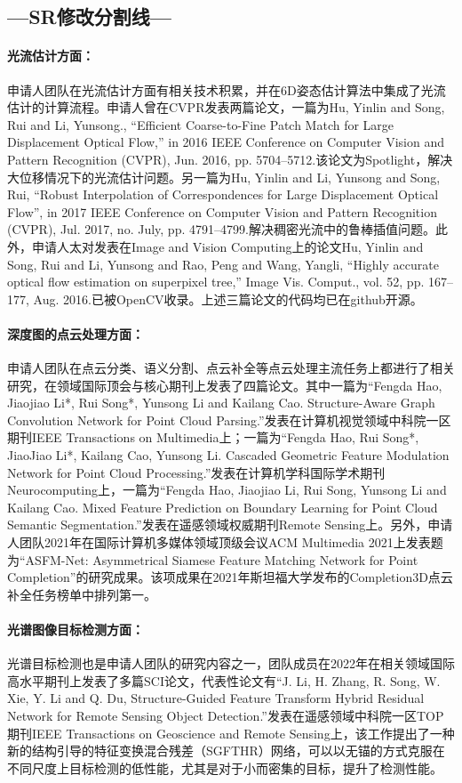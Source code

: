 \documentclass[12pt]{article}
\newcommand{\myPara}[1]{\paragraph{#1：}}
\begin{document}
\subsection{---SR修改分割线---}
\fi
\myPara{光流估计方面}
申请人团队在光流估计方面有相关技术积累，并在6D姿态估计算法中集成了光流估计的计算流程。申请人曾在CVPR发表两篇论文，一篇为Hu, Yinlin and Song, Rui and Li, Yunsong., “Efficient Coarse-to-Fine Patch Match for Large Displacement Optical Flow,” in 2016 IEEE Conference on Computer Vision and Pattern Recognition (CVPR), Jun. 2016, pp. 5704–5712.该论文为Spotlight，解决大位移情况下的光流估计问题。另一篇为Hu, Yinlin and Li, Yunsong and Song, Rui, “Robust Interpolation of Correspondences for Large Displacement Optical Flow”, in 2017 IEEE Conference on Computer Vision and Pattern Recognition (CVPR), Jul. 2017, no. July, pp. 4791–4799.解决稠密光流中的鲁棒插值问题。此外，申请人太对发表在Image and Vision Computing上的论文Hu, Yinlin and Song, Rui and Li, Yunsong and Rao, Peng and Wang, Yangli, “Highly accurate optical flow estimation on superpixel tree,” Image Vis. Comput., vol. 52, pp. 167–177, Aug. 2016.已被OpenCV收录。上述三篇论文的代码均已在github开源。

\myPara{深度图的点云处理方面}
申请人团队在点云分类、语义分割、点云补全等点云处理主流任务上都进行了相关研究，在领域国际顶会与核心期刊上发表了四篇论文。其中一篇为“Fengda Hao, Jiaojiao Li*, Rui Song*, Yunsong Li and Kailang Cao. Structure-Aware Graph Convolution Network for Point Cloud Parsing.”发表在计算机视觉领域中科院一区期刊IEEE Transactions on Multimedia上；一篇为“Fengda Hao, Rui Song*, JiaoJiao Li*, Kailang Cao, Yunsong Li. Cascaded Geometric Feature Modulation Network for Point Cloud Processing.”发表在计算机学科国际学术期刊Neurocomputing上，一篇为“Fengda Hao, Jiaojiao Li, Rui Song, Yunsong Li and Kailang Cao. Mixed Feature Prediction on Boundary Learning for Point Cloud Semantic Segmentation.”发表在遥感领域权威期刊Remote Sensing上。另外，申请人团队2021年在国际计算机多媒体领域顶级会议ACM Multimedia 2021上发表题为“ASFM-Net: Asymmetrical Siamese Feature Matching Network for Point Completion”的研究成果。该项成果在2021年斯坦福大学发布的Completion3D点云补全任务榜单中排列第一。

\myPara{光谱图像目标检测方面}
光谱目标检测也是申请人团队的研究内容之一，团队成员在2022年在相关领域国际高水平期刊上发表了多篇SCI论文，代表性论文有“J. Li, H. Zhang, R. Song, W. Xie, Y. Li and Q. Du, Structure-Guided Feature Transform Hybrid Residual Network for Remote Sensing Object Detection.”发表在遥感领域中科院一区TOP期刊IEEE Transactions on Geoscience and Remote Sensing上，该工作提出了一种新的结构引导的特征变换混合残差（SGFTHR）网络，可以以无锚的方式克服在不同尺度上目标检测的低性能，尤其是对于小而密集的目标，提升了检测性能。
\end{document}
